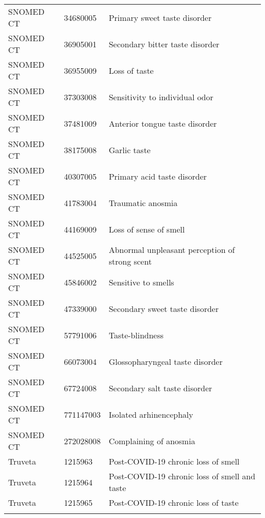 \begin{longtable}{p{}p{}p{}}
  SNOMED CT & 34680005 & Primary sweet taste disorder \\ 
  SNOMED CT & 36905001 & Secondary bitter taste disorder \\ 
  SNOMED CT & 36955009 & Loss of taste \\ 
  SNOMED CT & 37303008 & Sensitivity to individual odor \\ 
  SNOMED CT & 37481009 & Anterior tongue taste disorder \\ 
  SNOMED CT & 38175008 & Garlic taste \\ 
  SNOMED CT & 40307005 & Primary acid taste disorder \\ 
  SNOMED CT & 41783004 & Traumatic anosmia \\ 
  SNOMED CT & 44169009 & Loss of sense of smell \\ 
  SNOMED CT & 44525005 & Abnormal unpleasant perception of strong scent \\ 
  SNOMED CT & 45846002 & Sensitive to smells \\ 
  SNOMED CT & 47339000 & Secondary sweet taste disorder \\ 
  SNOMED CT & 57791006 & Taste-blindness \\ 
  SNOMED CT & 66073004 & Glossopharyngeal taste disorder \\ 
  SNOMED CT & 67724008 & Secondary salt taste disorder \\ 
  SNOMED CT & 771147003 & Isolated arhinencephaly \\ 
  SNOMED CT & 272028008 & Complaining of anosmia \\ 
  Truveta & 1215963 & Post-COVID-19 chronic loss of smell \\ 
  Truveta & 1215964 & Post-COVID-19 chronic loss of smell and taste \\ 
  Truveta & 1215965 & Post-COVID-19 chronic loss of taste \\ 
  \hline
\label{tab:codes_anosmia}
\end{longtable}
